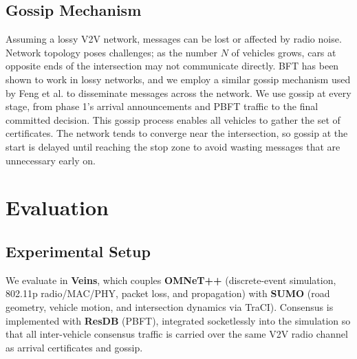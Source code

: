 \documentclass[letterpaper,10pt,conference]{IEEEtran}
\begin{document}
\subsection{Gossip Mechanism}
\label{sec:gossip}

Assuming a lossy V2V network, messages can be lost or affected by radio noise. Network topology poses challenges; as the number $N$ of vehicles grows, cars at opposite ends of the intersection may not communicate directly. BFT has been shown to work in lossy networks, and we employ a similar gossip mechanism used by Feng et al. to disseminate messages across the network. We use gossip at every stage, from phase 1's arrival announcements and PBFT traffic to the final committed decision. This gossip process enables all vehicles to gather the set of certificates. The network tends to converge near the intersection, so gossip at the start is delayed until reaching the stop zone to avoid wasting messages that are unnecessary early on. 

\section{Evaluation}
\label{sec:evaluation}

%
%
%
%
%
%
%


\subsection{Experimental Setup}
\label{sec:eval-setup}


We evaluate in \textbf{Veins}, which couples \textbf{OMNeT++} (discrete-event
simulation, 802.11p radio/MAC/PHY, packet loss, and propagation) with
\textbf{SUMO} (road geometry, vehicle motion, and intersection dynamics via
TraCI). Consensus is implemented with \textbf{ResDB} (PBFT), integrated
socketlessly into the simulation so that all inter-vehicle consensus traffic
is carried over the same V2V radio channel as arrival certificates and gossip.
\end{document}
